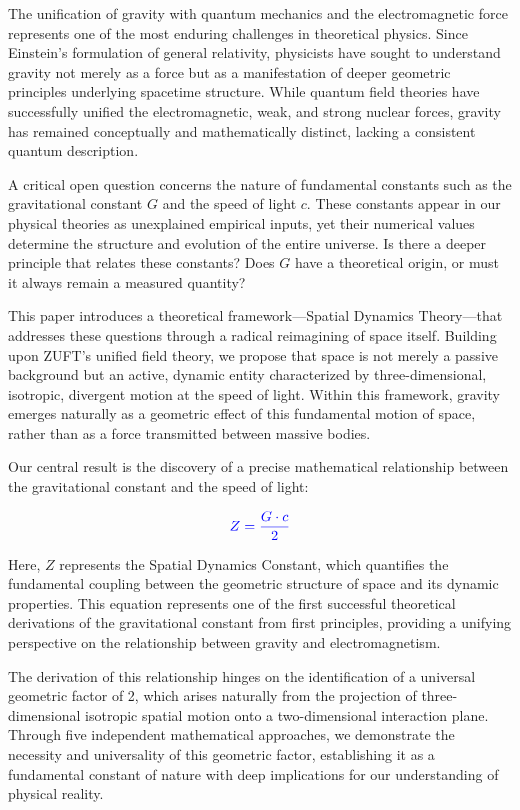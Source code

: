 \documentclass[nature,numbers]{article}
\newcommand{\highlight}[1]{\textcolor{blue}{#1}} %
\begin{document}
The unification of gravity with quantum mechanics and the electromagnetic force represents one of the most enduring challenges in theoretical physics. Since Einstein's formulation of general relativity, physicists have sought to understand gravity not merely as a force but as a manifestation of deeper geometric principles underlying spacetime structure. While quantum field theories have successfully unified the electromagnetic, weak, and strong nuclear forces, gravity has remained conceptually and mathematically distinct, lacking a consistent quantum description.

A critical open question concerns the nature of fundamental constants such as the gravitational constant $G$ and the speed of light $c$. These constants appear in our physical theories as unexplained empirical inputs, yet their numerical values determine the structure and evolution of the entire universe. Is there a deeper principle that relates these constants? Does $G$ have a theoretical origin, or must it always remain a measured quantity?

This paper introduces a theoretical framework—Spatial Dynamics Theory—that addresses these questions through a radical reimagining of space itself. Building upon ZUFT's unified field theory, we propose that space is not merely a passive background but an active, dynamic entity characterized by three-dimensional, isotropic, divergent motion at the speed of light. Within this framework, gravity emerges naturally as a geometric effect of this fundamental motion of space, rather than as a force transmitted between massive bodies.

Our central result is the discovery of a precise mathematical relationship between the gravitational constant and the speed of light:

$$\highlight{Z = \frac{G \cdot c}{2}}$$

Here, $Z$ represents the Spatial Dynamics Constant, which quantifies the fundamental coupling between the geometric structure of space and its dynamic properties. This equation represents one of the first successful theoretical derivations of the gravitational constant from first principles, providing a unifying perspective on the relationship between gravity and electromagnetism.

The derivation of this relationship hinges on the identification of a universal geometric factor of 2, which arises naturally from the projection of three-dimensional isotropic spatial motion onto a two-dimensional interaction plane. Through five independent mathematical approaches, we demonstrate the necessity and universality of this geometric factor, establishing it as a fundamental constant of nature with deep implications for our understanding of physical reality.
\end{document}
